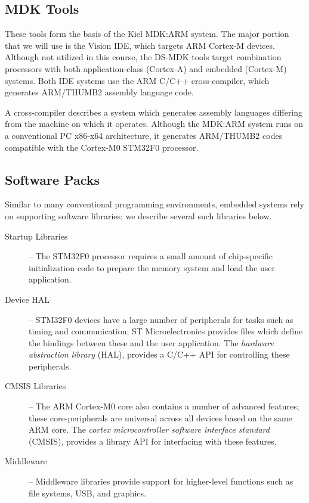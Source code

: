 \documentclass[openany,11pt,fleqn]{book} %
\begin{document}
\subsection*{MDK Tools}
These tools form the basis of the Kiel MDK:ARM system. The major portion that we will use is the {\textmu}Vision IDE, which targets ARM Cortex-M devices. Although not utilized in this course, the DS-MDK tools target combination processors with both application-class (Cortex-A) and embedded (Cortex-M) systems. Both IDE systems use the ARM C/C++ cross-compiler, which generates ARM/THUMB2 assembly language code.

A cross-compiler describes a system which generates assembly languages differing from the machine on which it operates. Although the MDK:ARM system runs on a conventional PC x86-x64 architecture, it generates ARM/THUMB2 codes compatible with the Cortex-M0 STM32F0 processor.

\subsection*{Software Packs}
Similar to many conventional programming environments, embedded systems rely on supporting software libraries; we describe several such libraries below.

\begin{description}
	\item[Startup Libraries] -- The STM32F0 processor requires a small amount of chip-specific initialization code to prepare the memory system and load the user application.  
	\item[Device HAL] -- STM32F0 devices have a large number of peripherals for tasks such as timing and communication; ST Microelectronics provides files which define the bindings between these and the user application. The \textit{hardware abstraction library} (HAL), provides a C/C++ API for controlling these peripherals.
	\item[CMSIS Libraries] -- The ARM Cortex-M0 core also contains a number of advanced features; these core-peripherals are universal across all devices based on the same ARM core. The \textit{cortex microcontroller software interface standard} (CMSIS), provides a library API for interfacing with these features. 
	\item[Middleware] -- Middleware libraries provide support for higher-level functions such as file systems, USB, and graphics.
\end{description}


\end{document}
